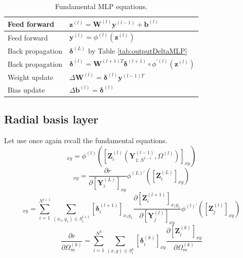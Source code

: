 \documentclass[a4paper,10pt]{article}
\theoremstyle{definition}
\begin{document}
\begin{table}[H]
	\centering
	\begin{tabular}{|p{4cm}| l|}
		\hline
		Feed forward  & $\pmb{z}^{(l)} = \pmb{W}^{(l)}\pmb{y}^{(l-1)} + \pmb{b}^{(l)}$ \\
		\hline
		Feed forward & $\pmb{y}^{(l)} = \phi^{(l)}(\pmb{z}^{(l)})$\\
		\hline
		Back propagation & $\pmb{\delta}^{(L)}$ by Table \ref{tab:outputDeltaMLP}\\
		\hline
		Back propagation & $\pmb{\delta}^{(l)} = \pmb{W}^{(l+1)T} \pmb{\delta}^{(l+1)} \circ \phi^{'(l)}(\pmb{z}^{(l)})$\\
		\hline
		Weight update & $\Delta\pmb{W}^{(l)} = \pmb{\delta}^{(l)} \pmb{y}^{(l-1)T}$\\
		\hline
		Bias update & $\Delta \pmb{b}^{(l)} = \pmb{\delta}^{(l)}$\\
		\hline
	\end{tabular}
	\caption{Fundamental MLP equations.}
\end{table}

\subsection{Radial basis layer}
Let use once again recall the fundamental equations.
\begin{equation}
[\pmb{Y}_i^{(l)}]_{xy} = \phi^{(l)}([\pmb{Z}^{(l)}_{i}(\pmb{Y}^{(l-1)}_{1:N^{l-1}}, \Omega^{(l)})]_{xy})
\end{equation}
\begin{equation}
[\pmb{\delta}_i^{(L)}]_{xy} = \frac{\partial r}{\partial [\pmb{Y}^{(L)}_i]_{xy}}\phi^{(L)'}([\pmb{Z}^{(L)}_{i}]_{xy})
\end{equation}
\begin{equation}
[\pmb{\delta}_j^{(l)}]_{xy} = \sum_{i = 1}^{N^{l+1}}\sum_{(x_1,y_1) \in S^{l+1}_i} [\pmb{\delta}^{(l+1)}_i]_{x_1y_1} \frac{\partial [\pmb{Z}^{(l + 1)}_{i}]_{x_1y_1}}{\partial [\pmb{Y}^{(l)}_j]_{xy}} \phi^{(l)'}([\pmb{Z}^{(l)}_{j}]_{xy})
\end{equation}
\begin{equation}
\frac{\partial r}{\partial \Omega^{(k)}_m} = \sum_{i = 1}^{N^{k}}\sum_{(x,y) \in S^{k}_i} [\pmb{\delta}_i^{(k)}]_{xy} \frac{\partial [\pmb{Z}^{(k)}_i]_{xy}}{\partial \Omega^{(k)}_m}
\end{equation}
\end{document}

